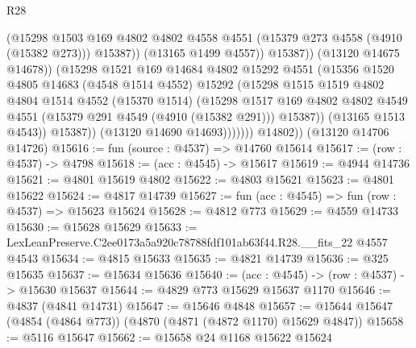 \begin{lexlean}{R28}
\begin{coremodule}
                                (@15298
                                  @1503
                                  @169
                                  @4802
                                  @4802
                                  @4558
                                  @4551
                                  (@15379 @273 @4558 (@4910 (@15382 @273)))
                                  @15387))
                              (@13165 @1499 @4557))
                            @15387))
                        (@13120 @14675 @14678))
                      (@15298
                        @1521
                        @169
                        @14684
                        @4802
                        @15292
                        @4551
                        (@15356
                          @1520
                          @4805
                          @14683
                          (@4548 @1514 @4552)
                          @15292
                          (@15298
                            @1515
                            @1519
                            @4802
                            @4804
                            @1514
                            @4552
                            (@15370 @1514)
                            (@15298
                              @1517
                              @169
                              @4802
                              @4802
                              @4549
                              @4551
                              (@15379 @291 @4549 (@4910 (@15382 @291)))
                              @15387))
                          (@13165 @1513 @4543))
                        @15387))
                    (@13120 @14690 @14693)))))))
        @14802))
    (@13120 @14706 @14726)
@15616 := fun (source : @4537) => @14760 @15614
@15617 := (row : @4537) -> @4798
@15618 := (acc : @4545) -> @15617
@15619 := @4944 @14736
@15621 := @4801 @15619 @4802
@15622 := @4803 @15621
@15623 := @4801 @15622
@15624 := @4817 @14739
@15627 := fun (acc : @4545) => fun (row : @4537) => @15623 @15624
@15628 := @4812 @773
@15629 := @4559 @14733
@15630 := @15628 @15629
@15633 := LexLeanPreserve.C2ee0173a5a920c78788fdf101ab63f44.R28.__fits_22 @4557 @4543
@15634 := @4815 @15633
@15635 := @4821 @14739
@15636 := @325 @15635
@15637 := @15634 @15636
@15640 := (acc : @4545) -> (row : @4537) -> @15630 @15637
@15644 := @4829 @773 @15629 @15637 @1170
@15646 := @4837 (@4841 @14731)
@15647 := @15646 @4848
@15657 := @15644 @15647 (@4854 (@4864 @773)) (@4870 (@4871 (@4872 @1170) @15629 @4847))
@15658 := @5116 @15647
@15662 := @15658 @24 @1168 @15622 @15624

\end{coremodule}
\end{lexlean}
